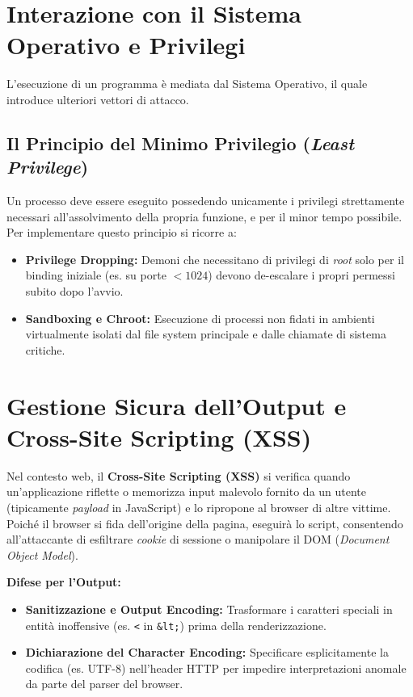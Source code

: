 \section{Interazione con il Sistema Operativo e Privilegi}
L'esecuzione di un programma è mediata dal Sistema Operativo, il quale introduce ulteriori vettori di attacco.

\subsection{Il Principio del Minimo Privilegio (\textit{Least Privilege})}
Un processo deve essere eseguito possedendo unicamente i privilegi strettamente necessari all'assolvimento della propria funzione, e per il minor tempo possibile. Per implementare questo principio si ricorre a:
\begin{itemize}
    \item \textbf{Privilege Dropping:} Demoni che necessitano di privilegi di \textit{root} solo per il binding iniziale (es. su porte $< 1024$) devono de-escalare i propri permessi subito dopo l'avvio.
    \item \textbf{Sandboxing e Chroot:} Esecuzione di processi non fidati in ambienti virtualmente isolati dal file system principale e dalle chiamate di sistema critiche.
\end{itemize}

\section{Gestione Sicura dell'Output e Cross-Site Scripting (XSS)}
Nel contesto web, il \textbf{Cross-Site Scripting (XSS)} si verifica quando un'applicazione riflette o memorizza input malevolo fornito da un utente (tipicamente \textit{payload} in JavaScript) e lo ripropone al browser di altre vittime. Poiché il browser si fida dell'origine della pagina, eseguirà lo script, consentendo all'attaccante di esfiltrare \textit{cookie} di sessione o manipolare il DOM (\textit{Document Object Model}).

\textbf{Difese per l'Output:}
\begin{itemize}
    \item \textbf{Sanitizzazione e Output Encoding:} Trasformare i caratteri speciali in entità inoffensive (es. \texttt{<} in \texttt{\&lt;}) prima della renderizzazione.
    \item \textbf{Dichiarazione del Character Encoding:} Specificare esplicitamente la codifica (es. UTF-8) nell'header HTTP per impedire interpretazioni anomale da parte del parser del browser.
\end{itemize}

